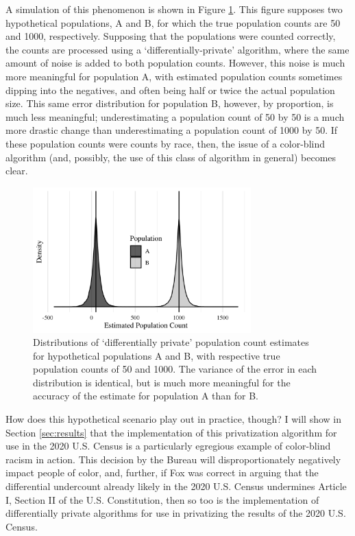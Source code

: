 A simulation of this phenomenon is shown in Figure \ref{fig:dif-priv}. This figure supposes two hypothetical populations, A and B, for which the true population counts are 50 and 1000, respectively. Supposing that the populations were counted correctly, the counts are processed using a `differentially-private' algorithm, where the same amount of noise is added to both population counts. However, this noise is much more meaningful for population A, with estimated population counts sometimes dipping into the negatives, and often being half or twice the actual population size. This same error distribution for population B, however, by proportion, is much less meaningful; underestimating a population count of 50 by 50 is a much more drastic change than underestimating a population count of 1000 by 50. If these population counts were counts by race, then, the issue of a color-blind algorithm (and, possibly, the use of this class of algorithm in general) becomes clear. 

\begin{figure}[ht]
   \centering
   \includegraphics[width=0.75\textwidth]{figures/dif_priv.png}
   \caption{Distributions of `differentially private' population count estimates for hypothetical populations A and B, with respective true population counts of 50 and 1000. The variance of the error in each distribution is identical, but is much more meaningful for the accuracy of the estimate for population A than for B.}
   \label{fig:dif-priv}
\end{figure}

How does this hypothetical scenario play out in practice, though? I will show in Section \ref{sec:results} that the implementation of this privatization algorithm for use in the 2020 U.S. Census is a particularly egregious example of color-blind racism in action. This decision by the Bureau will disproportionately negatively impact people of color, and, further, if Fox \cite{fox_differential_2018} was correct in arguing that the differential undercount already likely in the 2020 U.S. Census undermines Article I, Section II of the U.S. Constitution, then so too is the implementation of differentially private algorithms for use in privatizing the results of the 2020 U.S. Census.


